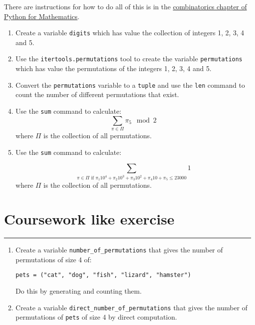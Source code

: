 \documentclass{article}
\begin{document}
There are instructions for how to do all of this is in the
\href{https://vknight.org/pfm/tools-for-mathematics/05-combinations-permutations/how/main.html}{combinatorics chapter of Python for Mathematics}.


\begin{enumerate}
    \item Create a variable \texttt{digits} which has value the
        collection of integers 1, 2, 3, 4 and 5.
\item
    Use the \texttt{itertools.permutations} tool to create the
        variable \texttt{permutations} which has value the
        permutations of the integers 1, 2, 3, 4 and 5. 
    \item Convert the \texttt{permutations} variable to a
        \texttt{tuple} and use the \texttt{len} command
        to count the number of different permutations that exist.
    \item Use the \texttt{sum} command to calculate:
        \[\sum_{\pi \in \Pi}\pi_5\mod 2\] where $\Pi$ is the collection of all
        permutations. 
    \item Use the \texttt{sum} command to calculate:

        \[\sum_{\pi \in \Pi \text{ if }\pi_1 10 ^ 4 + \pi_2 10 ^ 3 + \pi_3 10 ^ 2 + \pi_4 10 + \pi_5 \leq 23000} 1 \] 
        where $\Pi$ is the collection of all
        permutations. 
\end{enumerate}


\section{Coursework like exercise}
\hrule


\begin{enumerate}
    \item Create a variable \texttt{number_of_permutations} that gives the 
number of permutations of size 4 of:

\texttt{pets = ("cat", "dog", "fish", "lizard", "hamster")}

Do this by generating and counting them.
\item Create a variable \texttt{direct_number_of_permutations} that gives 
    the number of permutations of \texttt{pets} of size 4 by 
        direct computation.
\end{enumerate}
\end{document}
